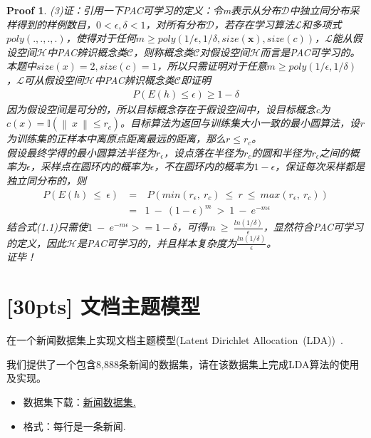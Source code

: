 \documentclass[a4paper,UTF8]{article}
\numberwithin{equation}{section}
\newtheorem*{myProof}{Proof}
\begin{document}
\begin{myProof}
\noindent
(3)证：引用一下PAC可学习的定义：令m表示从分布$\mathcal{D}$中独立同分布采样得到的样例数目，$0<\epsilon,\delta<1$，对所有分布$\mathcal{D}$，若存在学习算法$\mathcal{L}$和多项式$poly(.,.,.,.)$，使得对于任何$m \ge poly(1/\epsilon,1/\delta,size(\mathbf{x}),size(c))$，$\mathcal{L}$能从假设空间$\mathcal{H}$中PAC辨识概念类$\mathcal{C}$，则称概念类$\mathcal{C}$对假设空间$\mathcal{H}$而言是PAC可学习的。\\
本题中$size(x)=2,size(c)=1$，所以只需证明对于任意$m \ge poly(1/\epsilon,1/\delta)$，$\mathcal{L}$可从假设空间$\mathcal{H}$中PAC辨识概念类$\mathcal{C}$即证明
\begin{eqnarray}
    P(E(h) \le \epsilon) \ge 1-\delta
\end{eqnarray}
因为假设空间是可分的，所以目标概念存在于假设空间中，设目标概念c为$c(x)=\mathbb{I}(\left\|\ x\ \right\| \le r_c)$。目标算法为返回与训练集大小一致的最小圆算法，设r为训练集的正样本中离原点距离最远的距离，那么$r \le r_c$。\\
假设最终学得的最小圆算法半径为$r_\epsilon$，设点落在半径为$r_c$的圆和半径为$r_\epsilon$之间的概率为$\epsilon$，采样点在圆环内的概率为$\epsilon$，不在圆环内的概率为$1-\epsilon$，保证每次采样都是独立同分布的，则
\begin{eqnarray*}
    P(E(h)\ \le\ \epsilon)\ &=&\ P(min(r_\epsilon,\ r_c)\ \le\ r\ \le\ max(r_\epsilon,\ r_c))\\
    &=& 1\ -\ (1-\epsilon)^m\ >\ 1\ -\ e^{-m\epsilon}
\end{eqnarray*}
结合式(1.1)只需使$1\ -\ e^{-m\epsilon} >= 1 - \delta$，可得$m\ \ge\ \frac{ln(1/\delta)}{\epsilon}$，显然符合PAC可学习的定义，因此$\mathcal{H}$是PAC可学习的，并且样本复杂度为$\frac{ln(1/\delta)}{\epsilon}$。\\
证毕！


\end{myProof}
\newpage

\section{[30pts] 文档主题模型}
在一个新闻数据集上实现文档主题模型(Latent Dirichlet Allocation~(LDA))~\cite{DBLP:journals/jmlr/BleiNJ03}.

我们提供了一个包含8,888条新闻的数据集，请在该数据集上完成LDA算法的使用及实现。

\begin{itemize}
	\item 数据集下载：\href{http://lamda.nju.edu.cn/ml2018grad/dataset/news.txt.zip}{新闻数据集.}
	\item 格式：每行是一条新闻.
\end{itemize}
\end{document}
